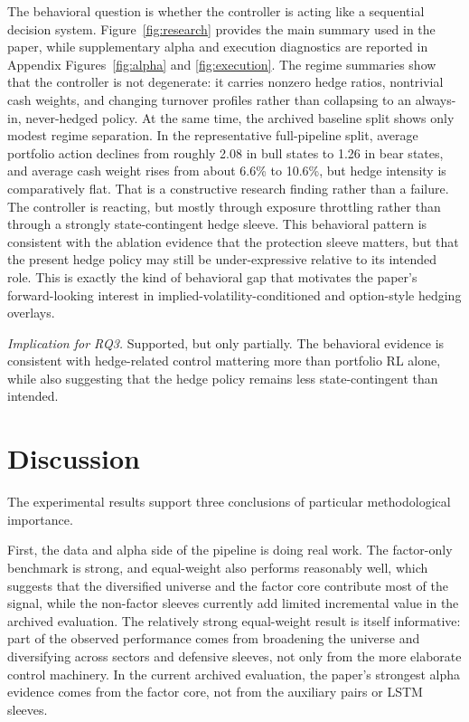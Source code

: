 \documentclass[11pt]{article}
\begin{document}
The behavioral question is whether the controller is acting like a sequential
decision system. Figure~\ref{fig:research} provides the main summary used in the
paper, while supplementary alpha and execution diagnostics are reported in
Appendix Figures~\ref{fig:alpha} and \ref{fig:execution}. The regime
summaries show that the controller is not degenerate:
it carries nonzero hedge ratios, nontrivial cash weights, and changing turnover
profiles rather than collapsing to an always-in, never-hedged policy. At the
same time, the archived baseline split shows only modest regime separation. In
the representative full-pipeline split, average portfolio action declines from
roughly 2.08 in bull states to 1.26 in bear states, and average cash weight
rises from about 6.6\% to 10.6\%, but hedge intensity is comparatively flat.
That is a constructive research finding rather than a failure. The controller is
reacting, but mostly through exposure throttling rather than through a strongly
state-contingent hedge sleeve. This behavioral pattern is consistent with the
ablation evidence that the protection sleeve matters, but that the present hedge
policy may still be under-expressive relative to its intended role. This is
exactly the kind of behavioral gap that motivates the paper's forward-looking
interest in implied-volatility-conditioned and option-style hedging overlays.

\noindent\textit{Implication for RQ3.} Supported, but only partially. The
behavioral evidence is consistent with hedge-related control mattering more than
portfolio RL alone, while also suggesting that the hedge policy remains less
state-contingent than intended.

\section{Discussion}

The experimental results support three conclusions of particular methodological importance.

First, the data and alpha side of the pipeline is doing real work. The
factor-only benchmark is strong, and equal-weight also performs reasonably well,
which suggests that the diversified universe and the factor core contribute most
of the signal, while the non-factor sleeves currently add limited incremental
value in the archived evaluation. The relatively strong equal-weight result is
itself informative: part of the observed performance comes from broadening the
universe and diversifying across sectors and defensive sleeves, not only from
the more elaborate control machinery. In the current archived evaluation, the
paper's strongest alpha evidence comes from the factor core, not from the
auxiliary pairs or LSTM sleeves.
\end{document}
